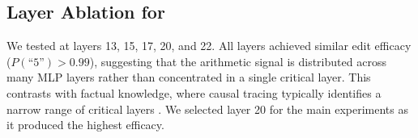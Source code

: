 \subsection{Layer Ablation for \rome}

We tested \rome at layers 13, 15, 17, 20, and 22.
All layers achieved similar edit efficacy ($P(\text{``5''}) > 0.99$), suggesting that the arithmetic signal is distributed across many MLP layers rather than concentrated in a single critical layer.
This contrasts with factual knowledge, where causal tracing typically identifies a narrow range of critical layers \citep{meng2022rome}.
We selected layer 20 for the main experiments as it produced the highest efficacy.
